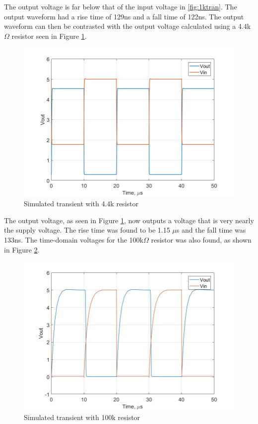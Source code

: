 The output voltage is far below that of the input voltage in \ref{fig:1ktran}. The output waveform had a rise time of 129ns and a fall time of 122ns. The output waveform can then be contrasted with the output voltage calculated using a 4.4k$\Omega$ resistor seen in Figure \ref{fig:4ktran}.

\begin{figure}[H]
    \centering
    \includegraphics[scale = .30]{CircuitDevelopment/NMOS/tran_4k_nmos.jpg}
    \caption{Simulated transient with 4.4k resistor}
    \label{fig:4ktran}
\end{figure}

The output voltage, as seen in Figure \ref{fig:4ktran}, now outputs a voltage that is very nearly the supply voltage. The rise time was found to be 1.15 $\mu$s and the fall time was 133ns. The time-domain voltages for the 100k$\Omega$ resistor was also found, as shown in Figure \ref{fig:100ktran}. 

\begin{figure}[H]
    \centering
    \includegraphics[scale = .30]{CircuitDevelopment/NMOS/tran_100knmos.jpg}
    \caption{Simulated transient with 100k resistor}
    \label{fig:100ktran}
\end{figure}

